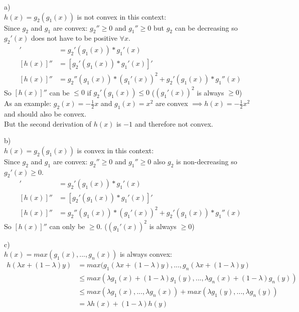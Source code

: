 %
%
%
\begin{flushleft}
a)\\
$h(x)=g_2(g_1(x))$ is not convex in this context:\\
Since $g_2$ and $g_1$ are convex: $g_2''\geq0$ and $g_1''\geq0$ but $g_2$ can 
be decreasing so $g_2'(x)$ does not have to be positive $\forall x$.
\begin{align*}
[h(x)]' &= g_2'(g_1(x))*g_1'(x)\\
[h(x)]'' &= [g_2'(g_1(x))*g_1'(x)]'\\
[h(x)]'' &= g_2''(g_1(x))*(g_1'(x))^2 + g_2'(g_1(x))*g_1''(x)
\end{align*}
So $[h(x)]''$ can be $\leq 0$ if $g_2'(g_1(x)) \leq 0$ ($(g_1'(x))^2$ is 
always $\geq 0$)\\
As an example: $g_2(x)=-\frac{1}{2}x$ and $g_1(x)=x^2$ are convex $\implies h(x)=-\frac{1}{2}x^2$ and should also be convex.\\
But the second derivation of $h(x)$ is $-1$ and therefore not convex.
\end{flushleft}
\begin{flushleft}
b)\\
$h(x)=g_2(g_1(x))$ is convex in this context:\\
Since $g_2$ and $g_1$ are convex: $g_2''\geq0$ and $g_1''\geq0$ also $g_2$ is 
non-decreasing so $g_2'(x) \geq 0$.
\begin{align*}
[h(x)]' &= g_2'(g_1(x))*g_1'(x)\\
[h(x)]'' &= [g_2'(g_1(x))*g_1'(x)]'\\
[h(x)]'' &= g_2''(g_1(x))*(g_1'(x))^2 + g_2'(g_1(x))*g_1''(x)
\end{align*}
So $[h(x)]''$ can only be $\geq 0$. ($(g_1'(x))^2$ is always $\geq 0$)
\end{flushleft}
\begin{flushleft}
c)\\
$h(x)=max(g_1(x),...,g_n(x))$ is always convex:\\
\begin{align*}
h(\lambda x+ (1- \lambda)y) &= max(g_1(\lambda x+ (1- \lambda)y), ... , 
g_n(\lambda x+ (1- \lambda)y)\\
&\leq max(\lambda g_1(x) + (1-\lambda)g_1(y),...,\lambda g_n(x) + (1-\lambda)g_n(y))\\
&\leq max(\lambda g_1(x), ... , \lambda g_n(x)) + max(\lambda g_1(y), ... , \lambda g_n(y))\\
&= \lambda h(x) + (1-\lambda)h(y)
\end{align*}
\end{flushleft}
